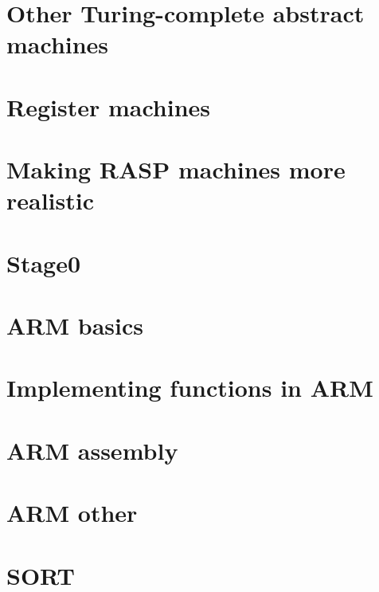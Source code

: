 \documentclass[oneside]{book}
\begin{document}
\part{Other Turing-complete abstract machines}


\part{Register machines}







\part{Making RASP machines more realistic}




\part{Stage0}


\part{ARM basics}





\part{Implementing functions in ARM}




\part{ARM assembly}




\part{ARM other}


\part{SORT}

\end{document}

